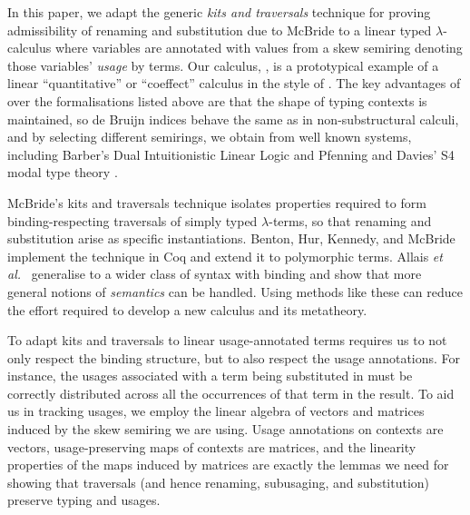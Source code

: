 \documentclass[submission,copyright,creativecommons]{eptcs}
\begin{document}

In this paper, we adapt the generic \emph{kits and traversals}
technique for proving admissibility of renaming and substitution due
to McBride \cite{rensub05} to a linear typed $\lambda$-calculus where
variables are annotated with values from a skew semiring denoting
those variables' \emph{usage} by terms. Our calculus, \name{}, is a
prototypical example of a linear ``quantitative'' or ``coeffect''
calculus in the style of
\cite{reed10distance,BrunelGMZ14,GhicaS14,PetricekOM14,Granule18}. The
key advantages of \name{} over the formalisations listed above are
that the shape of typing contexts is maintained, so de Bruijn indices
behave the same as in non-substructural calculi, and by selecting
different semirings, we obtain from \name{} well known systems,
including Barber's Dual Intuitionistic Linear Logic \cite{Barber1996}
and Pfenning and Davies' S4 modal type theory \cite{judgmental}.

McBride's kits and traversals technique isolates properties required
to form binding-respecting traversals of simply typed $\lambda$-terms,
so that renaming and substitution arise as specific
instantiations. Benton, Hur, Kennedy, and McBride \cite{bhkm12}
implement the technique in Coq and extend it to polymorphic
terms. Allais \emph{et al.}~\cite{AACMM20} generalise to a wider class
of syntax with binding and show that more general notions of
\emph{semantics} can be handled.
Using methods like these can reduce the effort required to develop a new
calculus and its metatheory.

To adapt kits and traversals to linear usage-annotated terms requires
us to not only respect the binding structure, but to also respect the
usage annotations. For instance, the usages associated with a term
being substituted in must be correctly distributed across all the
occurrences of that term in the result. To aid us in tracking usages,
we employ the linear algebra of vectors and matrices
induced by the skew semiring we are using. Usage annotations on
contexts are vectors, usage-preserving maps of contexts are matrices,
and the linearity properties of the maps induced by matrices are
exactly the lemmas we need for showing that traversals (and hence
renaming, subusaging, and substitution) preserve typing and usages.
\end{document}

